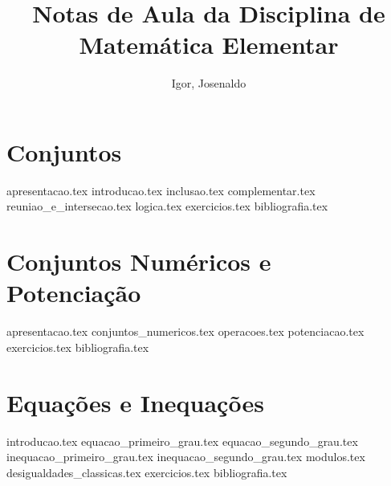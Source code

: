 \documentclass[a4paper,12pt, oneside]{book}
\begin{document}
    \title{Notas de Aula da Disciplina de Matemática Elementar}
    \author{Igor, Josenaldo} %

    \frontmatter %
    \maketitle
    \tableofcontents

    \mainmatter %

    \chapter{Conjuntos}
    {apresentacao.tex}
    {introducao.tex}
    {inclusao.tex}
    {complementar.tex}
    {reuniao_e_intersecao.tex}
    {logica.tex}
    {exercicios.tex}
    {bibliografia.tex} %

    \chapter{Conjuntos Numéricos e Potenciação}    
    {apresentacao.tex}
    {conjuntos_numericos.tex}
    {operacoes.tex}
    {potenciacao.tex}
    {exercicios.tex}
    {bibliografia.tex} %

    \chapter{Equações e Inequações}
    {introducao.tex}
    {equacao_primeiro_grau.tex}
    {equacao_segundo_grau.tex}
    {inequacao_primeiro_grau.tex}
    {inequacao_segundo_grau.tex}
    {modulos.tex}
    {desigualdades_classicas.tex}
    {exercicios.tex}
    {bibliografia.tex} %
\end{document}
